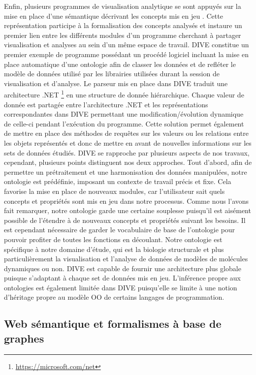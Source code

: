 Enfin, plusieurs programmes de visualisation analytique se sont appuyés sur la mise en place d'une sémantique décrivant les concepts mis en jeu \cite{rysavy_dive:_2014}. Cette représentation participe à la formalisation des concepts analysés et instaure un premier lien entre les différents modules d'un programme cherchant à partager visualisation et analyses au sein d'un même espace de travail. DIVE constitue un premier exemple de programme possédant un procédé logiciel incluant la mise en place automatique d'une ontologie afin de classer les données et de refléter le modèle de données utilisé par les librairies utilisées durant la session de visualisation et d'analyse. Le parseur mis en place dans DIVE traduit une architecture .NET \footnote{\url{https://microsoft.com/net}} en une structure de donnée hiérarchique. Chaque valeur de donnée est partagée entre l'architecture .NET et les représentations correspondantes dans DIVE permettant une modification/évolution dynamique de celle-ci pendant l’exécution du programme. Cette solution permet également de mettre en place des méthodes de requêtes sur les valeurs ou les relations entre les objets représentés et donc de mettre en avant de nouvelles informations sur les sets de données étudiés. DIVE se rapproche par plusieurs aspects de nos travaux, cependant, plusieurs points distinguent nos deux approches. Tout d'abord, afin de permettre un prétraitement et une harmonisation des données manipulées, notre ontologie est prédéfinie, imposant un contexte de travail précis et fixe. Cela favorise la mise en place de nouveaux modules, car l'utilisateur sait quels concepts et propriétés sont mis en jeu dans notre processus. Comme nous l'avons fait remarquer, notre ontologie garde une certaine souplesse puisqu'il est aisément possible de l'étendre à de nouveaux concepts et propriétés suivant les besoins. Il est cependant nécessaire de garder le vocabulaire de base de l'ontologie pour pouvoir profiter de toutes les fonctions en découlant. Notre ontologie est spécifique à notre domaine d'étude, qui est la biologie structurale et plus particulièrement la visualisation et l'analyse de données de modèles de molécules dynamiques ou non. DIVE est capable de fournir une architecture plus globale puisque s'adaptant à chaque set de données mis en jeu. L'inférence propre aux ontologies est également limitée dans DIVE puisqu'elle se limite à une notion d'héritage propre au modèle OO de certains langages de programmation.


\subsection{Web sémantique et formalismes à base de graphes}


